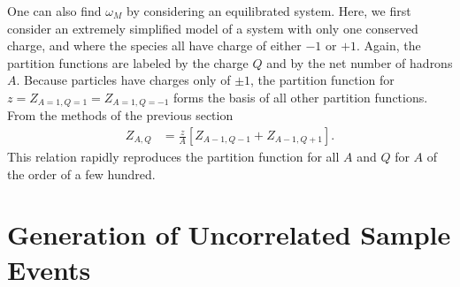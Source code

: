 \documentclass[aps,prc,nofootinbib,showpacs,superscriptaddress,groupedaddress]{revtex4-1}
\begin{document}
One can also find $\omega_M$ by considering an equilibrated system. Here, we first consider an extremely simplified model of a system with only one conserved charge, and where the species all have charge of either $-1$ or $+1$. Again, the partition functions are labeled by the charge $Q$ and by the net number of hadrons $A$. Because particles have charges only of $\pm 1$, the partition function for $z=Z_{A=1,Q=1}=Z_{A=1,Q=-1}$ forms the basis of all other partition functions. From the methods of the previous section
\begin{eqnarray}
Z_{A,Q}&=\frac{z}{A}\left[Z_{A-1,Q-1}+Z_{A-1,Q+1}\right].
\end{eqnarray}
This relation rapidly reproduces the partition function for all $A$ and $Q$ for $A$ of the order of a few hundred.

\section{Generation of Uncorrelated Sample Events}\label{sec:theoryMC}
\end{document}
